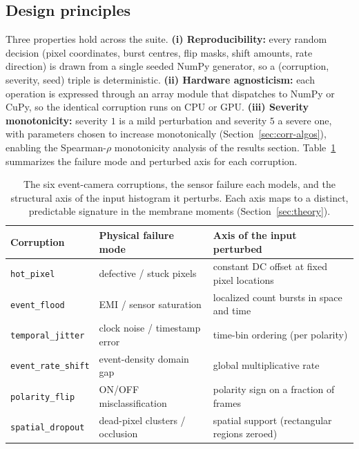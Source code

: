 \subsection{Design principles}
\label{sec:corruptions-design}

Three properties hold across the suite. \textbf{(i) Reproducibility:} every random decision
(pixel coordinates, burst centres, flip masks, shift amounts, rate direction) is drawn from a
single seeded NumPy generator, so a (corruption, severity, seed) triple is deterministic.
\textbf{(ii) Hardware agnosticism:} each operation is expressed through an array module that
dispatches to NumPy or CuPy, so the identical corruption runs on CPU or GPU.
\textbf{(iii) Severity monotonicity:} severity $1$ is a mild perturbation and severity $5$ a
severe one, with parameters chosen to increase monotonically (Section~\ref{sec:corr-algos}),
enabling the Spearman-$\rho$ monotonicity analysis of the results section. Table~\ref{tab:corr-taxonomy}
summarizes the failure mode and perturbed axis for each corruption.

\begin{table}[t]
  \centering
  \small
  \begin{tabularx}{\linewidth}{@{}l l X@{}}
    \toprule
    Corruption & Physical failure mode & Axis of the input perturbed \\
    \midrule
    \texttt{hot\_pixel}        & defective / stuck pixels        & constant DC offset at fixed pixel locations \\
    \texttt{event\_flood}      & EMI / sensor saturation         & localized count bursts in space and time \\
    \texttt{temporal\_jitter}  & clock noise / timestamp error   & time-bin ordering (per polarity) \\
    \texttt{event\_rate\_shift}& event-density domain gap         & global multiplicative rate \\
    \texttt{polarity\_flip}    & ON/OFF misclassification         & polarity sign on a fraction of frames \\
    \texttt{spatial\_dropout}  & dead-pixel clusters / occlusion & spatial support (rectangular regions zeroed) \\
    \bottomrule
  \end{tabularx}
  \caption{The six event-camera corruptions, the sensor failure each models, and the
  structural axis of the input histogram it perturbs. Each axis maps to a distinct,
  predictable signature in the membrane moments (Section~\ref{sec:theory}).}
  \label{tab:corr-taxonomy}
\end{table}

